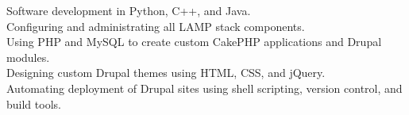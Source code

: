 \documentclass[margin,line]{resume}
\begin{document}
\begin{resume}
    Software development in Python, C++, and Java.\vspace{1mm}\\%
    Configuring and administrating all LAMP stack components.\vspace{1mm}\\%
    Using PHP and MySQL to create custom CakePHP applications and Drupal modules.\vspace{1mm}\\%
    Designing custom Drupal themes using HTML, CSS, and jQuery.\vspace{1mm}\\%
    Automating deployment of Drupal sites using shell scripting, version control, and build tools.\vspace{1mm}\\%

\end{resume}
\end{document}
